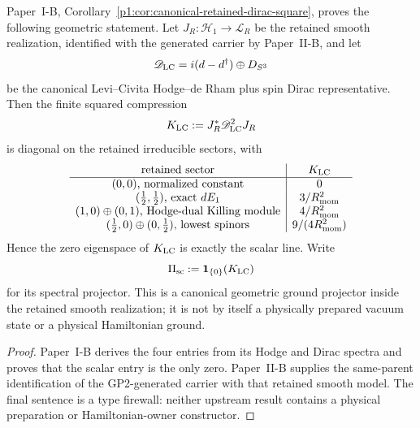 \documentclass[12pt,a4paper]{article}
\begin{document}
\begin{theorem}
\label{p2d:thm:canonical-retained-dirac-square}
Paper~I-B, Corollary~\ref{p1:cor:canonical-retained-dirac-square}, proves the
following geometric statement.  Let
\(J_R:\mathcal H_1\to\mathcal L_R\) be the retained smooth realization,
identified with the generated carrier by Paper~II-B, and let
\[
 \mathscr D_{\rm LC}=i(d-d^\dagger)\oplus D_{S^3}
\]
be the canonical Levi--Civita Hodge--de Rham plus spin Dirac representative.
Then the finite squared compression
\[
 K_{\rm LC}:=J_R^*\mathscr D_{\rm LC}^{2}J_R
\]
is diagonal on the retained irreducible sectors, with
\[
\begin{array}{c|c}
\text{retained sector} & K_{\rm LC}\\
\hline
(0,0)\text{, normalized constant} & 0\\
(\tfrac12,\tfrac12)\text{, exact }dE_1 & 3/R_{\mathrm{mom}}^2\\
(1,0)\oplus(0,1)\text{, Hodge-dual Killing module}
 & 4/R_{\mathrm{mom}}^2\\
(\tfrac12,0)\oplus(0,\tfrac12)\text{, lowest spinors}
 & 9/(4R_{\mathrm{mom}}^2)
\end{array}
\]
Hence the zero eigenspace of \(K_{\rm LC}\) is exactly the scalar line.
Write
\[
 \Pi_{\rm sc}:=\mathbf1_{\{0\}}(K_{\rm LC})
\]
for its spectral projector.  This is a canonical geometric ground projector
inside the retained smooth realization; it is not by itself a physically
prepared vacuum state or a physical Hamiltonian ground.
\end{theorem}

\begin{proof}
Paper~I-B derives the four entries from its Hodge and Dirac spectra and proves
that the scalar entry is the only zero.  Paper~II-B supplies the
same-parent identification of the GP2-generated carrier with that retained
smooth model.  The final sentence is a type firewall: neither upstream result
contains a physical preparation or Hamiltonian-owner constructor.
\end{proof}
\end{document}
